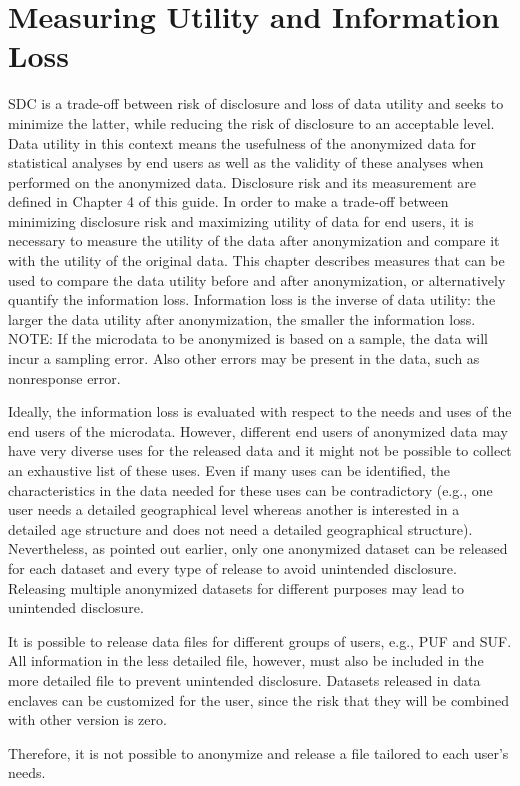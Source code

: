 \documentclass[letterpaper,10pt,english]{sphinxmanual}
\begin{document}
\chapter{Measuring Utility and Information Loss}
\label{\detokenize{utility::doc}}\label{\detokenize{utility:measuring-utility-and-information-loss}}
SDC is a trade-off between risk of disclosure and loss of data utility
and seeks to minimize the latter, while reducing the risk of disclosure
to an acceptable level. Data utility in this context means the
usefulness of the anonymized data for statistical analyses by end users
as well as the validity of these analyses when performed on the
anonymized data. Disclosure risk and its measurement are defined in
Chapter 4 of this guide. In order to make a trade-off between minimizing
disclosure risk and maximizing utility of data for end users, it is
necessary to measure the utility of the data after anonymization and
compare it with the utility of the original data. This chapter describes
measures that can be used to compare the data utility before and after
anonymization, or alternatively quantify the information loss.
Information loss is the inverse of data utility: the larger the data
utility after anonymization, the smaller the information loss. NOTE: If
the microdata to be anonymized is based on a sample, the data will incur
a sampling error. Also other errors may be present in the data, such as
nonresponse error. 

Ideally, the information loss is evaluated with respect to the needs and
uses of the end users of the microdata. However, different end users of
anonymized data may have very diverse uses for the released data and it
might not be possible to collect an exhaustive list of these uses. Even
if many uses can be identified, the characteristics in the data needed
for these uses can be contradictory (e.g., one user needs a detailed
geographical level whereas another is interested in a detailed age
structure and does not need a detailed geographical structure).
Nevertheless, as pointed out earlier, only one anonymized dataset can be
released for each dataset and every type of release to avoid unintended
disclosure. Releasing multiple anonymized datasets for different
purposes may lead to unintended disclosure. %
\begin{footnote}[1]\sphinxAtStartFootnote
It is possible to release data files for different groups of users,
e.g., PUF and SUF. All information in the less detailed file,
however, must also be included in the more detailed file to prevent
unintended disclosure. Datasets released in data enclaves can be
customized for the user, since the risk that they will be combined
with other version is zero.
%
\end{footnote}
Therefore, it is not possible to anonymize and release a file tailored
to each user’s needs.
\end{document}
